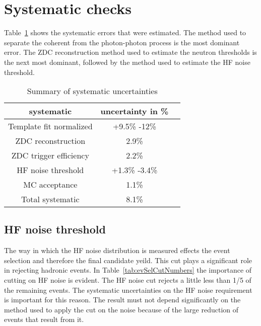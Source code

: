   \section{\label{sec:sysCheck} Systematic checks}

    Table~\ref{tab:sumsyst} shows the systematic errors that were estimated.
    The method used to separate the coherent from the photon-photon process 
     is the most dominant error.
    The ZDC reconstruction method used to estimate the neutron thresholds 
      is the next most dominant, followed by the method used to estimate
      the HF noise threshold. 

    \begin{table}[!Hhtb]
      \begin{center}
        \begin{tabular}{|c|c|c|}
          \hline
          systematic & uncertainty in \%  \\ \hline
          Template fit normalized & +9.5\% -12\%    \\ \hline
          ZDC reconstruction  & 2.9\%  \\ \hline
          ZDC trigger efficiency & 2.2\%    \\ \hline
          HF noise threshold & +1.3\% -3.4\%    \\ \hline 
          MC acceptance & 1.1\%    \\ \hline
          \hline \hline
          Total systematic & 8.1\%    \\ \hline
        \end{tabular}
        \caption{Summary of systematic uncertainties}
        \label{tab:sumsyst}
      \end{center}
    \end{table}

    \subsection{HF noise threshold}
      The way in which the HF noise distribution is measured effects the event 
        selection and therefore the final candidate yeild.
      This cut plays a significant role in rejecting hadronic events.
      In Table~\ref{tab:evSelCutNumbers} the importance of cutting on HF noise
        is evident. 
      The HF noise cut rejects a little less than 1/5 of the remaining events. 
      The systematic uncertainties on the HF noise requirement is important for
        this reason.
      The result must not depend significantly on the method used to apply the
        cut on the noise because of the large reduction of events that result
        from it. 

